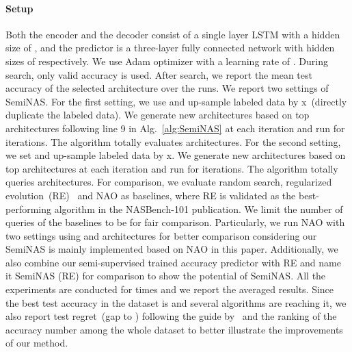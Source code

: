 \documentclass{article}
\begin{document}
\paragraph{Setup} Both the encoder and the decoder consist of a single layer LSTM with a hidden size of , and the predictor is a three-layer fully connected network with hidden sizes of  respectively. We use Adam optimizer with a learning rate of . During search, only valid accuracy is used. After search, we report the mean test accuracy of the selected architecture over the  runs. We report two settings of SemiNAS. For the first setting, we use  and up-sample  labeled data by x~(directly duplicate the labeled data). We generate  new architectures based on top  architectures following line 9 in Alg.~\ref{alg:SemiNAS} at each iteration and run for  iterations. The algorithm totally evaluates  architectures. For the second setting, we set  and up-sample  labeled data by x. We generate  new architectures based on top  architectures at each iteration and run for  iterations. The algorithm totally queries  architectures. For comparison, we evaluate random search, regularized evolution~(RE)~\cite{amoebanet} and NAO as baselines, where RE is validated as the best-performing algorithm in the NASBench-101 publication. We limit the number of queries of the baselines to be  for fair comparison. Particularly, we run NAO with two settings using  and  architectures for better comparison considering our SemiNAS is mainly implemented based on NAO in this paper. Additionally, we also combine our semi-supervised trained accuracy predictor with RE and name it SemiNAS (RE) for comparison to show the potential of SemiNAS. All the experiments are conducted for  times and we report the averaged results. Since the best test accuracy in the dataset is  and several algorithms are reaching it, we also report test regret~(gap to ) following the guide by~\cite{nasbench101} and the ranking of the accuracy number among the whole dataset to better illustrate the improvements of our method.
\end{document}
